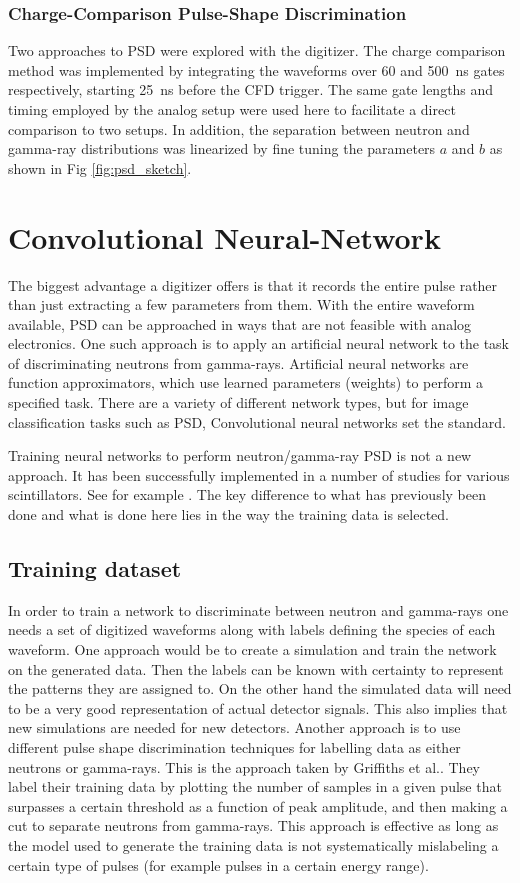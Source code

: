 \documentclass[main.tex]{subfiles}
\begin{document}
\subsubsection{Charge-Comparison Pulse-Shape Discrimination}
Two approaches to PSD were explored with the digitizer. The charge comparison method was implemented by integrating the waveforms over 60 and \SI{500}{ns} gates respectively, starting \SI{25}{ns} before the CFD trigger. The same gate lengths and timing employed by the analog setup were used here to facilitate a direct comparison to two setups. In addition, the separation between neutron and gamma-ray distributions was linearized by fine tuning the parameters $a$ and $b$ as shown in Fig \ref{fig:psd_sketch}.

\section{Convolutional Neural-Network}\label{sec:cnn}
The biggest advantage a digitizer offers is that it records the entire pulse rather than just extracting a few parameters from them. With the entire waveform available, PSD can be approached in ways that are not feasible with analog electronics. One such approach is to apply an artificial neural network to the task of discriminating neutrons from gamma-rays. 
Artificial neural networks are function approximators, which use learned parameters (weights) to perform a specified task. There are a variety of different network types, but for image classification tasks such as PSD, Convolutional neural networks set the standard. 

Training neural networks to perform neutron/gamma-ray PSD is not a new approach. It has been successfully implemented in a number of studies for various scintillators. See for example \cite{Griffiths}. The key difference to what has previously been done and what is done here lies in the way the training data is selected.

\subsection{Training dataset}
In order to train a network to discriminate between neutron and gamma-rays one needs a set of digitized waveforms along with labels defining the species of each waveform. One approach would be to create a simulation and train the network on the generated data. Then the labels can be known with certainty to represent the patterns they are assigned to. On the other hand the simulated data will need to be a very good representation of actual detector signals. This also implies that new simulations are needed for new detectors. Another approach is to use different pulse shape discrimination techniques for labelling data as either neutrons or gamma-rays. This is the approach taken by  Griffiths et al.\cite{Griffiths}. They label their training data by plotting the number of samples in a given pulse that surpasses a certain threshold as a function of peak amplitude, and then making a cut to separate neutrons from gamma-rays. This approach is effective as long as the model used to generate the training data is not systematically mislabeling a certain type of pulses (for example pulses in a certain energy range). 
\end{document}
